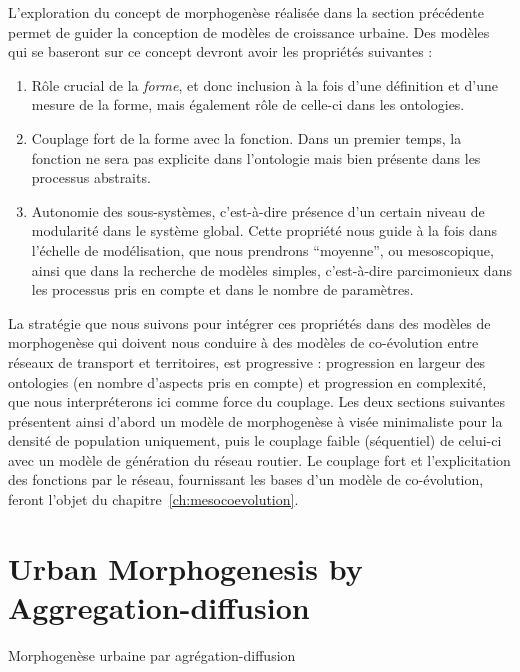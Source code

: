 




\newpage



L'exploration du concept de morphogenèse réalisée dans la section précédente permet de guider la conception de modèles de croissance urbaine. Des modèles qui se baseront sur ce concept devront avoir les propriétés suivantes :
\begin{enumerate}
	\item Rôle crucial de la \emph{forme}, et donc inclusion à la fois d'une définition et d'une mesure de la forme, mais également rôle de celle-ci dans les ontologies.
	\item Couplage fort de la forme avec la fonction. Dans un premier temps, la fonction ne sera pas explicite dans l'ontologie mais bien présente dans les processus abstraits.
	\item Autonomie des sous-systèmes, c'est-à-dire présence d'un certain niveau de modularité dans le système global. Cette propriété nous guide à la fois dans l'échelle de modélisation, que nous prendrons ``moyenne'', ou mesoscopique, ainsi que dans la recherche de modèles simples, c'est-à-dire parcimonieux dans les processus pris en compte et dans le nombre de paramètres.
\end{enumerate}

La stratégie que nous suivons pour intégrer ces propriétés dans des modèles de morphogenèse qui doivent nous conduire à des modèles de co-évolution entre réseaux de transport et territoires, est progressive : progression en largeur des ontologies (en nombre d'aspects pris en compte) et progression en complexité, que nous interpréterons ici comme force du couplage. Les deux sections suivantes présentent ainsi d'abord un modèle de morphogenèse à visée minimaliste pour la densité de population uniquement, puis le couplage faible (séquentiel) de celui-ci avec un modèle de génération du réseau routier. Le couplage fort et l'explicitation des fonctions par le réseau, fournissant les bases d'un modèle de co-évolution, feront l'objet du chapitre~\ref{ch:mesocoevolution}.



\stars



\newpage

\section{Urban Morphogenesis by Aggregation-diffusion}{Morphogenèse urbaine par agrégation-diffusion}

